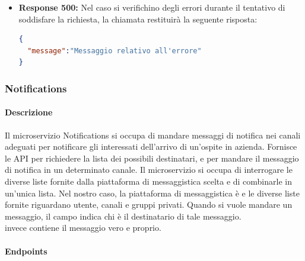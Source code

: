 \begin{itemize}
\begin{itemize}
\begin{lstlisting}[language=json,firstnumber=1]
{
  "message":"Forbidden"
}
\end{lstlisting}
\item \textbf{Response 500:} Nel caso si verifichino degli errori durante il tentativo di soddisfare la richiesta, la chiamata restituirà la seguente risposta:
\begin{lstlisting}[language=json,firstnumber=1]
{
  "message":"Messaggio relativo all'errore"
}
\end{lstlisting}
\end{itemize}
\end{itemize}


\subsubsection{Notifications}
\paragraph{Descrizione}
Il microservizio Notifications si occupa di mandare messaggi di notifica nei canali adeguati per notificare gli interessati dell'arrivo di un'ospite in azienda. Fornisce le API per richiedere la lista dei possibili destinatari, e per mandare il messaggio di notifica in un determinato canale.
Il microservizio si occupa di interrogare le diverse liste fornite dalla piattaforma di messaggistica scelta e di combinarle in un'unica lista. Nel nostro caso, la piattaforma di messaggistica è  e le diverse liste fornite riguardano utente, canali e gruppi privati. Quando si vuole mandare un messaggio, il campo  indica chi è il destinatario di tale messaggio.\\  invece contiene il messaggio vero e proprio.
\paragraph{Endpoints}

